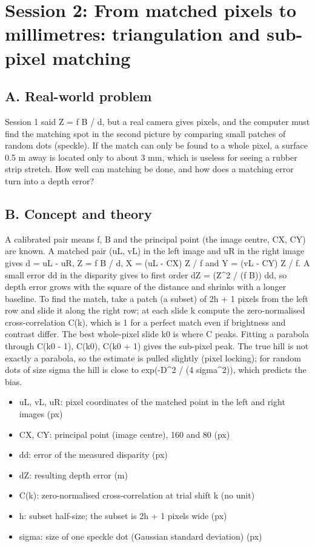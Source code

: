 \documentclass[11pt,a4paper]{article}
\begin{document}
\section{Session 2: From matched pixels to millimetres: triangulation and sub-pixel matching}

\subsection*{A. Real-world problem}
Session 1 said Z = f B / d, but a real camera gives pixels, and the computer must find the matching spot in the second picture by comparing small patches of random dots (speckle). If the match can only be found to a whole pixel, a surface 0.5 m away is located only to about 3 mm, which is useless for seeing a rubber strip stretch. How well can matching be done, and how does a matching error turn into a depth error?

\subsection*{B. Concept and theory}
A calibrated pair means f, B and the principal point (the image centre, CX, CY) are known. A matched pair (uL, vL) in the left image and uR in the right image gives d = uL - uR, Z = f B / d, X = (uL - CX) Z / f and Y = (vL - CY) Z / f. A small error dd in the disparity gives to first order dZ = (Z\textasciicircum{}2 / (f B)) dd, so depth error grows with the square of the distance and shrinks with a longer baseline. To find the match, take a patch (a subset) of 2h + 1 pixels from the left row and slide it along the right row; at each slide k compute the zero-normalised cross-correlation C(k), which is 1 for a perfect match even if brightness and contrast differ. The best whole-pixel slide k0 is where C peaks. Fitting a parabola through C(k0 - 1), C(k0), C(k0 + 1) gives the sub-pixel peak. The true hill is not exactly a parabola, so the estimate is pulled slightly (pixel locking); for random dots of size sigma the hill is close to exp(-D\textasciicircum{}2 / (4 sigma\textasciicircum{}2)), which predicts the bias.

\begin{itemize}[nosep]
\item uL, vL, uR: pixel coordinates of the matched point in the left and right images (px)
\item CX, CY: principal point (image centre), 160 and 80 (px)
\item dd: error of the measured disparity (px)
\item dZ: resulting depth error (m)
\item C(k): zero-normalised cross-correlation at trial shift k (no unit)
\item h: subset half-size; the subset is 2h + 1 pixels wide (px)
\item sigma: size of one speckle dot (Gaussian standard deviation) (px)
\end{itemize}
\end{document}
